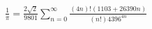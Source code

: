 \documentclass[preview]{standalone}
\begin{document}
\begin{align*}
\frac{1}{\pi} = \frac{2\sqrt{2}}{9801} \sum_{n=0}^{\infty} \frac{(4n)!(1103+26390n)}{(n!)4396^{4n}}
\end{align*}
\end{document}
